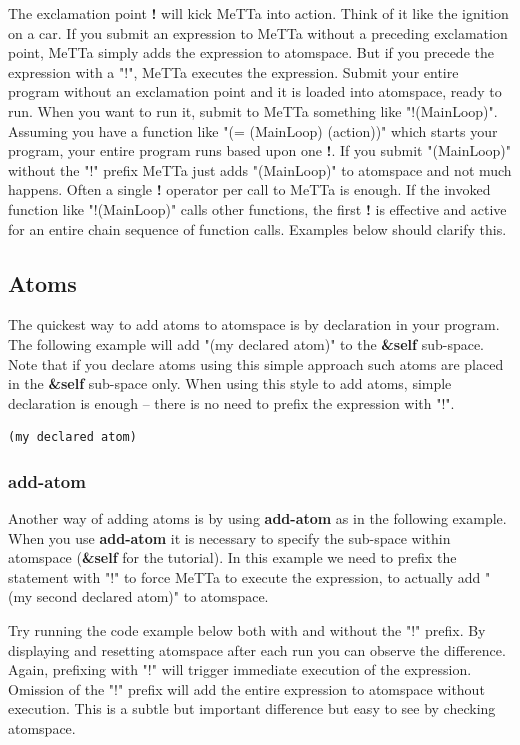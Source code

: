 \documentclass{article}
\begin{document}
The exclamation point \textbf{!} will kick MeTTa into action. Think of it like the ignition on a car. If you submit an expression to MeTTa without a preceding exclamation point, MeTTa simply adds the expression to atomspace. But if you precede the expression with a "!", MeTTa executes the expression. Submit your entire program without an exclamation point and it is loaded into atomspace, ready to run. When you want to run it, submit to MeTTa something like "!(MainLoop)". Assuming you have a function like "(= (MainLoop) (action))" which starts your program, your entire program runs based upon one \textbf{!}. If you submit "(MainLoop)" without the "!" prefix MeTTa just adds "(MainLoop)" to atomspace and not much happens. Often a single \textbf{!} operator per call to MeTTa is enough. If the invoked function like "!(MainLoop)" calls other functions, the first \textbf{!}
is effective and active for an entire chain sequence of function calls. Examples below should clarify this. 

\subsection{Atoms}

The quickest way to add atoms to atomspace is by declaration in your program. The following example will add "(my declared atom)" to the \textbf{&self} sub-space. Note that if you declare atoms using this simple approach such atoms are placed in the \textbf{&self} sub-space only. When using this style to add atoms, simple declaration is enough -- there is no need to prefix the expression with "!".

\begin{verbatim}
(my declared atom)
\end{verbatim}

\subsubsection{add-atom}

Another way of adding atoms is by using \textbf{add-atom} as in the following example. When you use \textbf{add-atom} it is necessary to specify the sub-space within atomspace (\textbf{&self} for the tutorial). In this example we need to prefix the statement with "!" to force MeTTa to execute the expression, to actually add "(my second declared atom)" to atomspace. 

Try running the code example below both with and without the "!" prefix. By displaying and resetting atomspace after each run you can observe the difference. Again, prefixing with "!" will trigger immediate execution of the expression. Omission of the "!" prefix will add the entire expression to atomspace without execution. This is a subtle but important difference but easy to see by checking atomspace.
\end{document}
